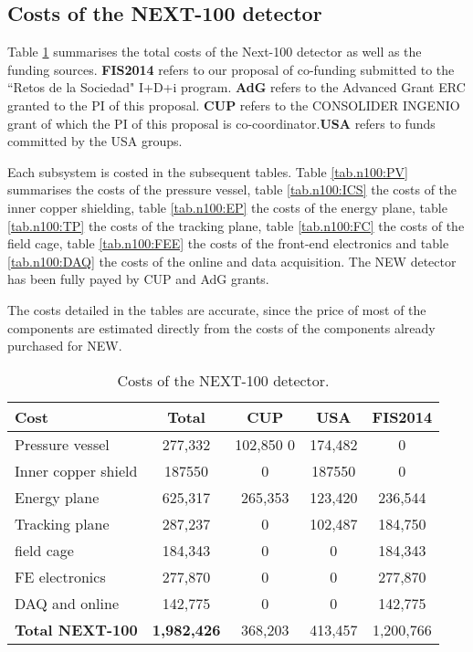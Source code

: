 \subsection{Costs of the NEXT-100 detector}
Table \ref{tab.n100:DET} summarises the total costs of the Next-100 detector as well as the funding sources. {\bf FIS2014} refers to our proposal of co-funding submitted to the ``Retos de la Sociedad" I+D+i program. {\bf AdG} refers to the Advanced Grant ERC granted to the PI of this proposal. {\bf CUP} refers to the CONSOLIDER INGENIO grant of which the PI of this proposal is co-coordinator.{\bf USA} refers to funds committed by the USA groups.

Each subsystem is costed in the subsequent tables. Table \ref{tab.n100:PV} summarises the costs of the pressure vessel, 
table \ref{tab.n100:ICS} the costs of the inner copper shielding,
table \ref{tab.n100:EP} the costs of the energy plane,
table \ref{tab.n100:TP} the costs of the tracking plane,
table \ref{tab.n100:FC} the costs of the field cage,
table \ref{tab.n100:FEE} the costs of the front-end electronics and
table \ref{tab.n100:DAQ} the costs of the online and data acquisition. The NEW detector has
been fully payed by CUP and AdG grants.

The costs detailed in the tables are  accurate, since the price of most of the components are estimated directly from the costs of the components already purchased for NEW. 
  
\begin{table}[h!]
\begin{center}
\begin{tabular}{|l|c|c|c|c|}
\hline
 Cost &	Total& 	CUP & USA & FIS2014 \\
 \hline
Pressure vessel &	277,332 & 102,850	0 &	174,482 & 0 \\
Inner copper shield &	187550 &	0 & 187550 & 0 \\
Energy plane	& 625,317 &	265,353	&	123,420	&	236,544 \\
Tracking plane	& 287,237 &	0 & 102,487	& 184,750 \\
field cage	& 184,343 &	0	& 0	&	184,343 \\
FE electronics	& 277,870 &	0 &	0 &	277,870 \\
DAQ and online &	142,775 & 	0	& 0	& 142,775 \\
 \hline
{\bf Total NEXT-100} &	{\bf1,982,426 }& 368,203& 	413,457 & 	1,200,766 \\	
 \hline\hline
\end{tabular}  
\caption{Costs of the NEXT-100 detector.}
\label{tab.n100:DET}
\end{center}
\end{table} 

